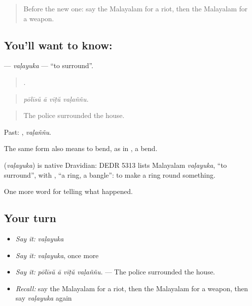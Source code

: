 \label{lesson:ML-C382-valayuka-surround}



\begin{quote}
Before the new one: say the Malayalam for a riot, then the Malayalam for a weapon.
\end{quote}

\subsection*{You'll want to know: }
\textbf{} — \emph{vaḷayuka} — \textquotedblleft{}to surround\textquotedblright{}.

\begin{quote}
   .
\end{quote}

\begin{quote}
\emph{pōlīsŭ ā vīṭŭ vaḷaññu.}
\end{quote}

\begin{quote}
The police surrounded the house.
\end{quote}

Past: , \emph{vaḷaññu}.

The same form also means to bend, as in , a bend.

\begin{cousinweb}
\textbf{} (\emph{vaḷayuka}) is native Dravidian: DEDR 5313 lists Malayalam \emph{vaḷayuka}, \textquotedblleft{}to surround\textquotedblright{}, with , \textquotedblleft{}a ring, a bangle\textquotedblright{}: to make a ring round something.
\end{cousinweb}

\begin{grammarlens}[title={What you've built}]
One more word for telling what happened.
\end{grammarlens}

\subsection*{Your turn}
\begin{itemize}
\raggedright
  \item \emph{Say it:} \emph{vaḷayuka}
  \item \emph{Say it:} \emph{vaḷayuka}, once more
  \item \emph{Say it:} \emph{pōlīsŭ ā vīṭŭ vaḷaññu.} — The police surrounded the house.
  \item \emph{Recall:} say the Malayalam for a riot, then the Malayalam for a weapon, then say \emph{vaḷayuka} again
\end{itemize}


